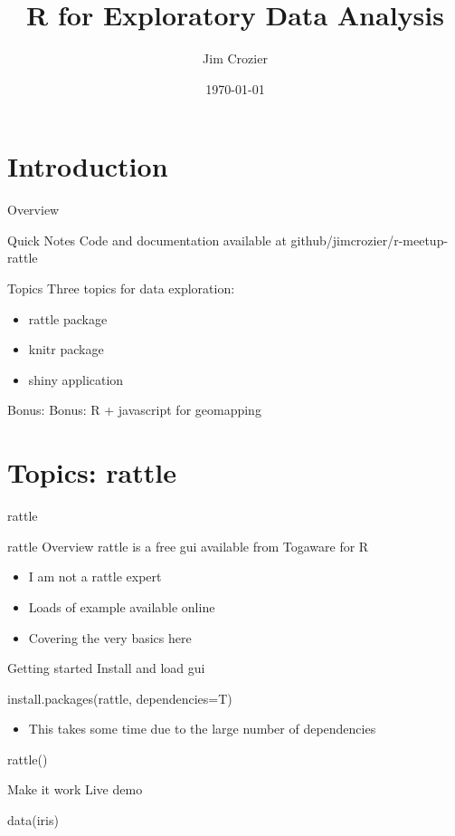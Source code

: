 \documentclass[xcolor=dvipsnames]{beamer}
\title{R for Exploratory Data Analysis}
\author{Jim Crozier}
\institute[Stratusfy LLC jim@stratusfy.com]{Stratusfy: Data Science and Cloud Technology.}
\date{\today}
\begin{document}

 
\begin{frame}
    \titlepage
\end{frame}
 
\section{Introduction}
\begin{frame}[t,allowframebreaks]{Overview}
\begin{block}{Quick Notes}
Code and documentation available at github/jimcrozier/r-meetup-rattle
\end{block}

\begin{block}{Topics}
Three topics for data exploration:
\end{block}
 
\begin{itemize}
    \item rattle package
    \item knitr package
    \item shiny application
\end{itemize}

\begin{block}{Bonus:}
Bonus: R + javascript for geomapping
\end{block}
 
\end{frame}

\section{Topics: rattle}
\begin{frame}[t,allowframebreaks]{rattle}
\begin{block}{rattle Overview }
rattle is a free gui available from Togaware for R
\end{block}

\begin{itemize}
\item I am not a rattle expert
\item Loads of example available online
\item Covering the very basics here
\end{itemize}
\begin{block}{Getting started }
Install and load gui
\end{block}

install.packages(rattle, dependencies=T)

\begin{itemize}
\item This takes some time due to the large number of dependencies
\end{itemize}
rattle()

\begin{block}{Make it work}
Live demo
\end{block}
data(iris)

\end{frame}
\end{document}
